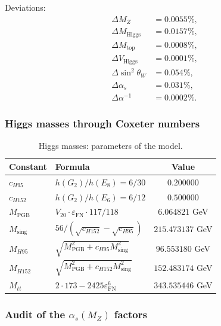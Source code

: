 \documentclass[11pt,a4paper]{article}
\theoremstyle{definition}
\begin{document}
\medskip\noindent
Deviations:
\begin{align}
    \Delta M_Z &= 0.0055\%, \\
    \Delta M_{\text{Higgs}} &= 0.0157\%, \\
    \Delta M_{\text{top}} &= 0.0008\%, \\
    \Delta V_{\text{Higgs}} &= 0.0001\%, \\
    \Delta \sin^2\theta_W &= 0.054\%, \\
    \Delta \alpha_s &= 0.031\%, \\
    \Delta \alpha^{-1} &= 0.0002\%.
\end{align}

\subsubsection{Higgs masses through Coxeter numbers}

\begin{table}[ht]
\centering
\caption{Higgs masses: parameters of the model.}
\label{tab:app-higgs}
\begin{tabular}{llc}
\toprule
Constant & Formula & Value \\
\midrule
$c_{H95}$ & $h(G_2)/h(E_8) = 6/30$ & $0.200000$ \\
$c_{H152}$ & $h(G_2)/h(E_6) = 6/12$ & $0.500000$ \\
$M_{\text{PGB}}$ & $V_{20} \cdot \varepsilon_{\text{FN}} \cdot 117/118$ & $6.064821$ GeV \\
$M_{\text{sing}}$ & $56/(\sqrt{c_{H152}} - \sqrt{c_{H95}})$ & $215.473137$ GeV \\
$M_{H95}$ & $\sqrt{M_{\text{PGB}}^2 + c_{H95} M_{\text{sing}}^2}$ & $96.553180$ GeV \\
$M_{H152}$ & $\sqrt{M_{\text{PGB}}^2 + c_{H152} M_{\text{sing}}^2}$ & $152.483174$ GeV \\
$M_{tt}$ & $2 \cdot 173 - 2425 \varepsilon_{\text{FN}}^6$ & $343.535446$ GeV \\
\bottomrule
\end{tabular}
\end{table}

\subsubsection{Audit of the \texorpdfstring{$\alpha_s(M_Z)$}{alpha\_s(M\_Z)} factors}
\end{document}
